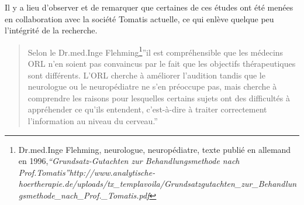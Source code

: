 Il y a lieu d'observer et de remarquer que certaines de ces études
ont été menées en collaboration avec la société Tomatis actuelle,
ce qui enlève quelque peu l'intégrité de la recherche.
\begin{quotation}
Selon le Dr.med.Inge Flehming\footnote{Dr.med.Inge Flehming, neurologue, neuropédiatre, texte publié en allemand
en 1996,\emph{``Grundsatz-Gutachten zur Behandlungsmethode nach Prof.Tomatis''http://www.analytische-hoertherapie.de/uploads/tx\_templavoila/Grundsatzgutachten\_zur\_Behandlungsmethode\_nach\_Prof.\_Tomatis.pdf}}''il est compréhensible que les médecins ORL n'en soient pas convaincus
par le fait que les objectifs thérapeutiques sont différents. L'ORL
cherche à améliorer l'audition tandis que le neurologue ou le neuropédiatre
ne s'en préoccupe pas, mais cherche à comprendre les raisons pour
lesquelles certains sujets ont des difficultés à appréhender ce qu'ils
entendent, c'est-à-dire à traiter correctement l'information au niveau
du cerveau.''
\end{quotation}
